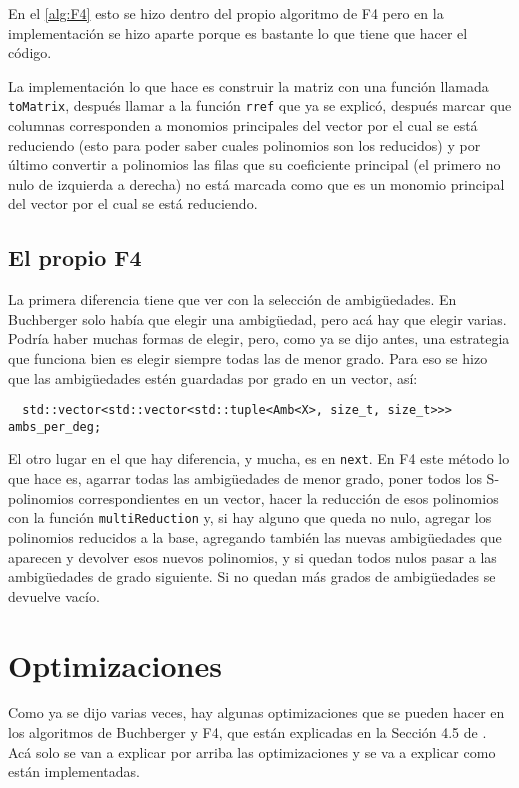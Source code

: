\documentclass[12pt]{report}
\theoremstyle{customstyle}
\theoremstyle{factstyle}
\begin{document}
En el \cref{alg:F4} esto se hizo dentro del propio algoritmo de F4 pero en la implementación se hizo aparte porque es bastante lo que tiene que hacer el código.

La implementación lo que hace es construir la matriz con una función llamada \texttt{toMatrix}, después llamar a la función \texttt{rref} que ya se explicó, después marcar que columnas corresponden a monomios principales del vector por el cual se está reduciendo (esto para poder saber cuales polinomios son los reducidos) y por último convertir a polinomios las filas que su coeficiente principal (el primero no nulo de izquierda a derecha) no está marcada como que es un monomio principal del vector por el cual se está reduciendo.

\subsection{El propio F4}

La primera diferencia tiene que ver con la selección de ambigüedades. En Buchberger solo había que elegir una ambigüedad, pero acá hay que elegir varias. Podría haber muchas formas de elegir, pero, como ya se dijo antes, una estrategia que funciona bien es elegir siempre todas las de menor grado. Para eso se hizo que las ambigüedades estén guardadas por grado en un vector, así:

\begin{verbatim}
  std::vector<std::vector<std::tuple<Amb<X>, size_t, size_t>>> ambs_per_deg;
\end{verbatim}

El otro lugar en el que hay diferencia, y mucha, es en \texttt{next}. En F4 este método lo que hace es, agarrar todas las ambigüedades de menor grado, poner todos los S-polinomios correspondientes en un vector, hacer la reducción de esos polinomios con la función \texttt{multiReduction} y, si hay alguno que queda no nulo, agregar los polinomios reducidos a la base, agregando también las nuevas ambigüedades que aparecen y devolver esos nuevos polinomios, y si quedan todos nulos pasar a las ambigüedades de grado siguiente. Si no quedan más grados de ambigüedades se devuelve vacío.

\section{Optimizaciones}\label{secton:optimizaciones}

Como ya se dijo varias veces, hay algunas optimizaciones que se pueden hacer en los algoritmos de Buchberger y F4, que están explicadas en la Sección 4.5 de \cite{thesis:Hof20}. Acá solo se van a explicar por arriba las optimizaciones y se va a explicar como están implementadas.
\end{document}
